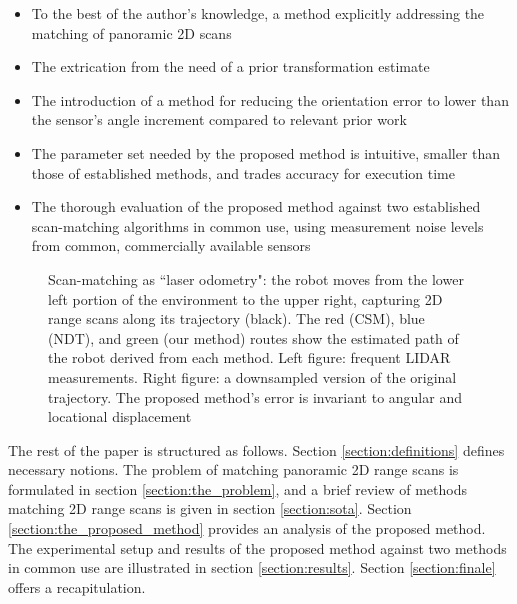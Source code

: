 \begin{itemize}
  \item To the best of the author's knowledge, a method explicitly addressing
        the matching of panoramic 2D scans
  \item The extrication from the need of a prior transformation estimate
  \item The introduction of a method for reducing the orientation error to
        lower than the sensor's angle increment compared to relevant prior work
  \item The parameter set needed by the proposed method is intuitive, smaller
        than those of established methods, and trades accuracy for execution
        time
  \item The thorough evaluation of the proposed method against two established
        scan-matching algorithms in common use, using measurement noise levels
        from common, commercially available sensors
\end{itemize}

\begin{figure}[]\centering
  \vspace{-1.7cm}
  
  \vspace{-2.3cm}
  \caption{\small Scan-matching as ``laser odometry": the robot moves from the
           lower left portion of the environment to the upper right, capturing
           2D range scans along its trajectory (black). The red (CSM), blue
           (NDT), and green (our method) routes show the estimated path of the
           robot derived from each method. Left figure: frequent LIDAR
           measurements.  Right figure: a downsampled version of the original
           trajectory. The proposed method's error is invariant to angular and
           locational displacement}
  \label{fig:laser_odometry}
\end{figure}

The rest of the paper is structured as follows. Section
\ref{section:definitions} defines necessary notions.  The problem of matching
panoramic 2D range scans is formulated in section \ref{section:the_problem},
and a brief review of methods matching 2D range scans is given in section
\ref{section:sota}. Section \ref{section:the_proposed_method} provides an
analysis of the proposed method. The experimental setup and results of the
proposed method against two methods in common use are illustrated in section
\ref{section:results}. Section \ref{section:finale} offers a recapitulation.
